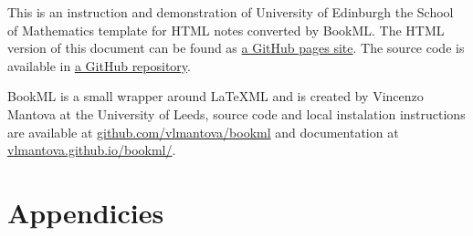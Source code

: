 \documentclass[12pt,oneside]{book}
\begin{document}


\maketitle

This is an instruction and demonstration of University of Edinburgh the School of Mathematics template for HTML notes converted by BookML. The HTML version of this document can be found as \href{https://uoe-school-of-mathematics.github.io/BookML-Workflow-Documentation/index.html}{a GitHub pages site}. The source code is available in \href{https://github.com/UoE-School-of-Mathematics/BookML-Workflow-Documentation}{a GitHub repository}.

BookML is a small wrapper around LaTeXML and is created by Vincenzo Mantova at the University of Leeds, source code and local instalation instructions are available at \url{github.com/vlmantova/bookml} and documentation at \url{vlmantova.github.io/bookml/}.


\tableofcontents





% 

\mainmatter




\chapter{Appendicies}






\appendix



\backmatter


\end{document}

